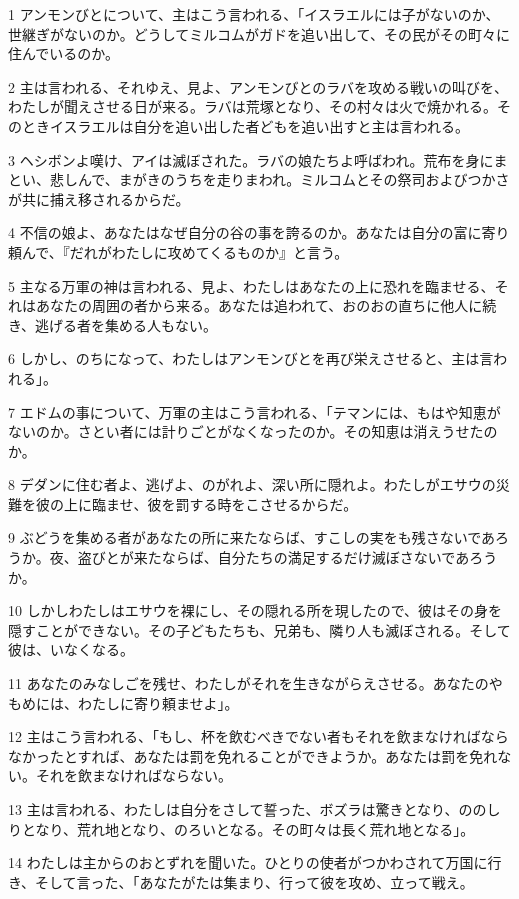 \par 1 アンモンびとについて、主はこう言われる、「イスラエルには子がないのか、世継ぎがないのか。どうしてミルコムがガドを追い出して、その民がその町々に住んでいるのか。
\par 2 主は言われる、それゆえ、見よ、アンモンびとのラバを攻める戦いの叫びを、わたしが聞えさせる日が来る。ラバは荒塚となり、その村々は火で焼かれる。そのときイスラエルは自分を追い出した者どもを追い出すと主は言われる。
\par 3 ヘシボンよ嘆け、アイは滅ぼされた。ラバの娘たちよ呼ばわれ。荒布を身にまとい、悲しんで、まがきのうちを走りまわれ。ミルコムとその祭司およびつかさが共に捕え移されるからだ。
\par 4 不信の娘よ、あなたはなぜ自分の谷の事を誇るのか。あなたは自分の富に寄り頼んで、『だれがわたしに攻めてくるものか』と言う。
\par 5 主なる万軍の神は言われる、見よ、わたしはあなたの上に恐れを臨ませる、それはあなたの周囲の者から来る。あなたは追われて、おのおの直ちに他人に続き、逃げる者を集める人もない。
\par 6 しかし、のちになって、わたしはアンモンびとを再び栄えさせると、主は言われる」。
\par 7 エドムの事について、万軍の主はこう言われる、「テマンには、もはや知恵がないのか。さとい者には計りごとがなくなったのか。その知恵は消えうせたのか。
\par 8 デダンに住む者よ、逃げよ、のがれよ、深い所に隠れよ。わたしがエサウの災難を彼の上に臨ませ、彼を罰する時をこさせるからだ。
\par 9 ぶどうを集める者があなたの所に来たならば、すこしの実をも残さないであろうか。夜、盗びとが来たならば、自分たちの満足するだけ滅ぼさないであろうか。
\par 10 しかしわたしはエサウを裸にし、その隠れる所を現したので、彼はその身を隠すことができない。その子どもたちも、兄弟も、隣り人も滅ぼされる。そして彼は、いなくなる。
\par 11 あなたのみなしごを残せ、わたしがそれを生きながらえさせる。あなたのやもめには、わたしに寄り頼ませよ」。
\par 12 主はこう言われる、「もし、杯を飲むべきでない者もそれを飲まなければならなかったとすれば、あなたは罰を免れることができようか。あなたは罰を免れない。それを飲まなければならない。
\par 13 主は言われる、わたしは自分をさして誓った、ボズラは驚きとなり、ののしりとなり、荒れ地となり、のろいとなる。その町々は長く荒れ地となる」。
\par 14 わたしは主からのおとずれを聞いた。ひとりの使者がつかわされて万国に行き、そして言った、「あなたがたは集まり、行って彼を攻め、立って戦え。
